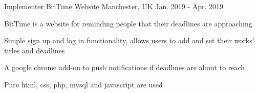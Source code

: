\begin{cventries}
  \cventry
    {Implementer} %
    {BitTime Website} %
    {Manchester, UK} %
    {Jan. 2019 - Apr. 2019} %
    {
      \begin{cvitems} %
        \item {BitTime is a website for reminding people that their deadlines are approaching}
        \item {Simple sign up and log in functionality, allows users to add and set their works' titles         and deadlines}
        \item {A google chrome add-on to push notifications if deadlines are about to reach}
        \item {Pure html, css, php, mysql and javascript are used}
      \end{cvitems}
    }


\end{cventries}
